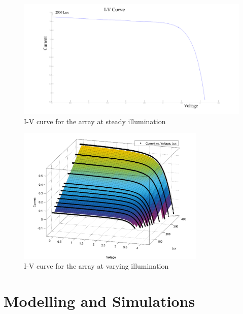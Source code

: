   \begin{figure}[H]
	  \begin{center}
		  \includegraphics[width=1.1\textwidth]{images/single2500_IV}
		  \caption{I-V curve for the array at steady illumination}
		  \label{fig:2500luxIV}
	  \end{center}
  \end{figure}
  
\begin{figure}[H]
	  \begin{center}
		  \includegraphics[width=0.8\textwidth]{images/I-V-lux}
		  \caption{I-V curve for the array at varying illumination}
		  \label{fig:luxIV100_2500}
	  \end{center}
  \end{figure}

\section{Modelling and Simulations}\label{sec:mod_sim} 

